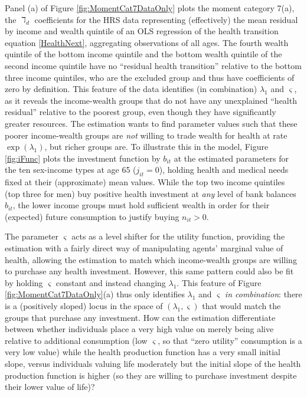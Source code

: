 \documentclass[12pt,pdftex,letterpaper]{article}
\newcommand{\Invst}{n}
\newcommand{\Bank}{b}
\newcommand{\LifeUtility}{\varsigma}
\newcommand{\Age}{j}
\newcommand{\HealthProdParamAlt}{\lambda}
\begin{document}
Panel (a) of Figure \ref{fig:MomentCat7DataOnly} plots the moment category 7(a), the $\daleth_d$ coefficients for the HRS data representing (effectively) the mean residual by income and wealth quintile of an OLS regression of the health transition equation \eqref{HealthNext}, aggregating observations of all ages.  The fourth wealth quintile of the bottom income quintile and the bottom wealth quintile of the second income quintile have no ``residual health transition'' relative to the bottom three income quintiles, who are the excluded group and thus have coefficients of zero by definition.  This feature of the data identifies (in combination) $\HealthProdParamAlt_1$ and $\LifeUtility$, as it reveals the income-wealth groups that do not have any unexplained ``health residual'' relative to the poorest group, even though they have significantly greater resources.  The estimation wants to find parameter values such that these poorer income-wealth groups are \textit{not} willing to trade wealth for health at rate $\exp(\HealthProdParamAlt_1)$, but richer groups are.  To illustrate this in the model, Figure \ref{fig:iFunc} plots the investment function by $\Bank_{it}$ at the estimated parameters for the ten sex-income types at age 65 ($\Age_{it}=0$), holding health and medical needs fixed at their (approximate) mean values.  While the top two income quintiles (top three for men) buy positive health investment at \textit{any} level of bank balances $\Bank_{it}$, the lower income groups must hold sufficient wealth in order for their (expected) future consumption to justify buying $\Invst_{it} > 0$.

The parameter $\LifeUtility$ acts as a level shifter for the utility function, providing the estimation with a fairly direct way of manipulating agents' marginal value of health, allowing the estimation to match which income-wealth groups are willing to purchase any health investment.  However, this same pattern could also be fit by holding $\LifeUtility$ constant and instead changing $\HealthProdParamAlt_1$.  This feature of Figure \ref{fig:MomentCat7DataOnly}(a) thus only identifies $\HealthProdParamAlt_1$ and $\LifeUtility$ \textit{in combination}: there is a (positively sloped) locus in the space of $(\HealthProdParamAlt_1,\LifeUtility)$ that would match the groups that purchase any investment.  How can the estimation differentiate between whether individuals place a very high value on merely being alive relative to additional consumption (low $\LifeUtility$, so that ``zero utility'' consumption is a very low value) while the health production function has a very small initial slope, versus individuals valuing life moderately but the initial slope of the health production function is higher (so they are willing to purchase investment despite their lower value of life)?
\end{document}
